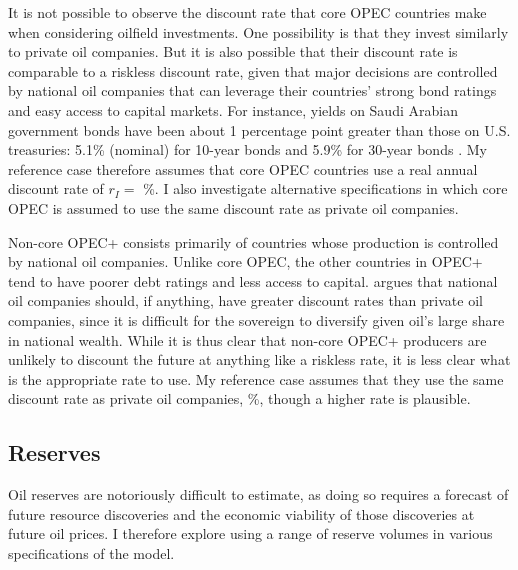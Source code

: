 \documentclass[12pt]{article}
\begin{document}
It is not possible to observe the discount rate that core OPEC countries make when considering oilfield investments. One possibility is that they invest similarly to private oil companies. But it is also possible that their discount rate is comparable to a riskless discount rate, given that major decisions are controlled by national oil companies that can leverage their countries' strong bond ratings and easy access to capital markets. For instance, yields on Saudi Arabian government bonds have been about 1 percentage point greater than those on U.S. treasuries: 5.1\% (nominal) for 10-year bonds and 5.9\% for 30-year bonds \citep{bloomberg_saudi_2024}. My reference case therefore assumes that core OPEC countries use a real annual discount rate of $r_I=$ \unskip\%. I also investigate alternative specifications in which core OPEC is assumed to use the same discount rate as private oil companies.

Non-core OPEC+ consists primarily of countries whose production is controlled by national oil companies. Unlike core OPEC, the other countries in OPEC+ tend to have poorer debt ratings and less access to capital. \cite{adelman1986} argues that national oil companies should, if anything, have greater discount rates than private oil companies, since it is difficult for the sovereign to diversify given oil's large share in national wealth. While it is thus clear that non-core OPEC+ producers are unlikely to discount the future at anything like a riskless rate, it is less clear what is the appropriate rate to use. My reference case assumes that they use the same discount rate as private oil companies, 
\unskip\%, though a higher rate is plausible.



\subsection{Reserves} \label{sec:cal_res}

Oil reserves are notoriously difficult to estimate, as doing so requires a forecast of future resource discoveries and the economic viability of those discoveries at future oil prices. I therefore explore using a range of reserve volumes in various specifications of the model.
\end{document}
